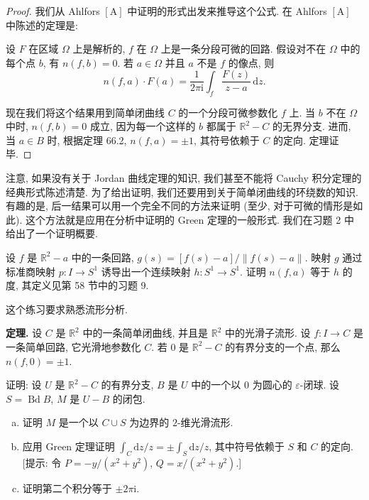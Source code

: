 \begin{proof}
我们从 Ahlfors $[\mathrm{A}]$ 中证明的形式出发来推导这个公式. 在 Ahlfors $[\mathrm{A}]$ 中陈述的定理是:

设 $F$ 在区域 $\Omega$ 上是解析的, $f$ 在 $\Omega$ 上是一条分段可微的回路. 假设对不在 $\Omega$ 中的每个点 $b$, 有 $n(f,b)=0$. 若 $a\in\Omega$ 并且 $a$ 不是 $f$ 的像点, 则
\[
n(f,a)\cdot F(a)=\frac{1}{2\pi\mathrm{i}}\int_{f}\frac{F(z)}{z-a}\,\mathrm{d}z.
\]

现在我们将这个结果用到简单闭曲线 $C$ 的一个分段可微参数化 $f$ 上. 当 $b$ 不在 $\Omega$ 中时, $n(f,b)=0$ 成立, 因为每一个这样的 $b$ 都属于 $\mathbb{R}^{2}-C$ 的无界分支. 进而, 当 $a\in B$ 时, 根据定理 66.2, $n(f,a)=\pm 1$, 其符号依赖于 $C$ 的定向. 定理证毕.
\end{proof}

注意, 如果没有关于 Jordan 曲线定理的知识, 我们甚至不能将 Cauchy 积分定理的经典形式陈述清楚. 为了给出证明, 我们还要用到关于简单闭曲线的环绕数的知识. 有趣的是, 后一结果可以用一个完全不同的方法来证明 (至少, 对于可微的情形是如此). 这个方法就是应用在分析中证明的 Green 定理的一般形式. 我们在习题 2 中给出了一个证明概要.

\begin{exercise}\label{ch10:ex-cauchy-1}
设 $f$ 是 $\mathbb{R}^{2}-a$ 中的一条回路, $g(s)=[f(s)-a]/\|f(s)-a\|$. 映射 $g$ 通过标准商映射 $p\colon I\to S^{1}$ 诱导出一个连续映射 $h\colon S^{1}\to S^{1}$. 证明 $n(f,a)$ 等于 $h$ 的度, 其定义见第 58 节中的习题 9.
\end{exercise}

\begin{exercise}\label{ch10:ex-cauchy-2}
这个练习要求熟悉流形分析.

\textbf{定理.} 设 $C$ 是 $\mathbb{R}^{2}$ 中的一条简单闭曲线, 并且是 $\mathbb{R}^{2}$ 中的光滑子流形. 设 $f\colon I\to C$ 是一条简单回路, 它光滑地参数化 $C$. 若 $0$ 是 $\mathbb{R}^{2}-C$ 的有界分支的一个点, 那么 $n(f,0)=\pm 1$.

证明: 设 $U$ 是 $\mathbb{R}^{2}-C$ 的有界分支, $B$ 是 $U$ 中的一个以 $0$ 为圆心的 $\varepsilon$-闭球. 设 $S=\operatorname{Bd}B$, $M$ 是 $U-B$ 的闭包.

\begin{enumerate}[(a)]
\item 证明 $M$ 是一个以 $C\cup S$ 为边界的 $2$-维光滑流形.
\item 应用 Green 定理证明 $\int_{C}\mathrm{d}z/z=\pm\int_{S}\mathrm{d}z/z$, 其中符号依赖于 $S$ 和 $C$ 的定向. [提示: 令 $P=-y/(x^{2}+y^{2})$, $Q=x/(x^{2}+y^{2})$.]
\item 证明第二个积分等于 $\pm 2\pi\mathrm{i}$.
\end{enumerate}
\end{exercise}